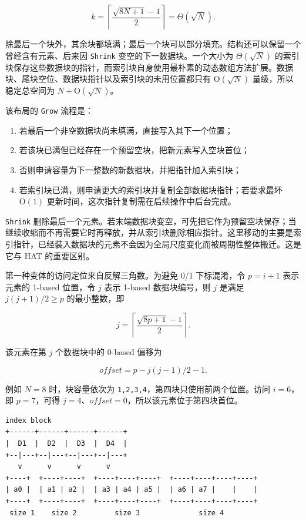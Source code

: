 \documentclass[UTF8,11pt,a4paper]{ctexart}
\begin{document}
\[
  k=\left\lceil\frac{\sqrt{8N+1}-1}{2}\right\rceil=\Theta(\sqrt{N}).
\]

除最后一个块外，其余块都填满；最后一个块可以部分填充。结构还可以保留一个曾经含有元素、后来因 \textnormal{\texttt{Shrink}} 变空的下一数据块。一个大小为 $\Theta(\sqrt{N})$ 的索引块保存这些数据块的指针，而索引块自身使用最朴素的动态数组方法扩展。数据块、尾块空位、数据块指针以及索引块的未用位置都只有 $\mathrm{O}(\sqrt{N})$ 量级，所以稳定总空间为 $N+\mathrm{O}(\sqrt{N})$。\par

该布局的 \textnormal{\texttt{Grow}} 流程是：\par

\begin{enumerate}
\item 若最后一个非空数据块尚未填满，直接写入其下一个位置；
\item 若该块已满但已经存在一个预留空块，把新元素写入空块首位；
\item 否则申请容量为下一整数的新数据块，并把指针加入索引块；
\item 若索引块已满，则申请更大的索引块并复制全部数据块指针；若要求最坏 $\mathrm{O}(1)$ 更新时间，这次指针复制需在后续操作中后台完成。
\end{enumerate}

\textnormal{\texttt{Shrink}} 删除最后一个元素。若末端数据块变空，可先把它作为预留空块保存；当继续收缩而不再需要它时再释放，并从索引块删除相应指针。这里移动的主要是索引指针，已经装入数据块的元素不会因为全局尺度变化而被周期性整体搬迁。这是它与 HAT 的重要区别。\par

第一种变体的访问定位来自反解三角数。为避免 0/1 下标混淆，令 $p=i+1$ 表示元素的 1-based 位置，令 $j$ 表示 1-based 数据块编号，则 $j$ 是满足 $j(j+1)/2\geq p$ 的最小整数，即\par

\[
  j=\left\lceil\frac{\sqrt{8p+1}-1}{2}\right\rceil.
\]

该元素在第 $j$ 个数据块中的 0-based 偏移为\par

\[
  offset = p - j(j-1)/2 - 1.
\]

例如 $N=8$ 时，块容量依次为 \textnormal{\texttt{1,2,3,4}}，第四块只使用前两个位置。访问 $i=6$，即 $p=7$，可得 $j=4$、$offset=0$，所以该元素位于第四块首位。\par

\begin{Verbatim}[fontsize=\scriptsize]
index block
+------+------+------+------+
|  D1  |  D2  |  D3  |  D4  |
+--|---+--|---+--|---+--|---+
   v      v      v      v
+----+  +----+----+  +----+----+----+  +----+----+----+----+
| a0 |  | a1 | a2 |  | a3 | a4 | a5 |  | a6 | a7 |    |    |
+----+  +----+----+  +----+----+----+  +----+----+----+----+
 size 1    size 2         size 3              size 4
\end{Verbatim}
\end{document}
